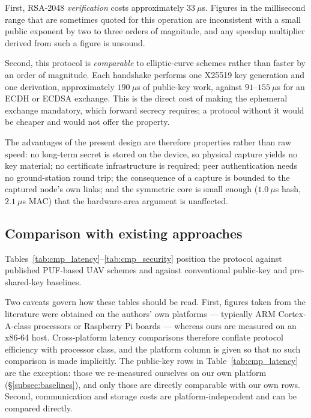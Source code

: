 \documentclass[11pt,a4paper]{article}
\begin{document}
First, RSA-2048 \emph{verification} costs approximately $33~\mu$s. Figures in the
millisecond range that are sometimes quoted for this operation are inconsistent
with a small public exponent by two to three orders of magnitude, and any speedup
multiplier derived from such a figure is unsound.

Second, this protocol is \emph{comparable} to elliptic-curve schemes rather than
faster by an order of magnitude. Each handshake performs one X25519 key generation
and one derivation, approximately $190~\mu$s of public-key work, against
$91$--$155~\mu$s for an ECDH or ECDSA exchange. This is the direct cost of making
the ephemeral exchange mandatory, which forward secrecy requires; a protocol
without it would be cheaper and would not offer the property.

The advantages of the present design are therefore properties rather than raw
speed: no long-term secret is stored on the device, so physical capture yields no
key material; no certificate infrastructure is required; peer authentication needs
no ground-station round trip; the consequence of a capture is bounded to the
captured node's own links; and the symmetric core is small enough
($1.0~\mu$s hash, $2.1~\mu$s MAC) that the hardware-area argument is unaffected.

\subsection{Comparison with existing approaches}
\label{subsec:comparison}

Tables~\ref{tab:cmp_latency}--\ref{tab:cmp_security} position the protocol against
published PUF-based UAV schemes and against conventional public-key and
pre-shared-key baselines.

Two caveats govern how these tables should be read. First, figures taken from the
literature were obtained on the authors' own platforms --- typically ARM
Cortex-A-class processors or Raspberry Pi boards --- whereas ours are measured on an
x86-64 host. Cross-platform latency comparisons therefore conflate protocol
efficiency with processor class, and the platform column is given so that no such
comparison is made implicitly. The public-key rows in
Table~\ref{tab:cmp_latency} are the exception: those we re-measured ourselves on
our own platform (\S\ref{subsec:baselines}), and only those are directly
comparable with our own rows. Second, communication and storage costs are
platform-independent and can be compared directly.
\end{document}
